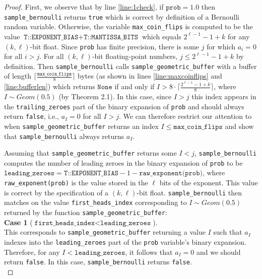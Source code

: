 \documentclass{article}
\begin{document}
\begin{proof}
First, we observe that by line \ref{line:1check}, if $\texttt{prob} = 1.0$ then \texttt{sample\_bernoulli} returns \texttt{true} which is correct by definition of a Bernoulli random variable. Otherwise, the variable \texttt{max\_coin\_flips} is computed to be the value $\texttt{T::EXPONENT\_BIAS} + \texttt{T::MANTISSA\_BITS}$ which equals $2^{\ell - 1} - 1 + k$ for any $(k,\ell)$-bit float. Since \texttt{prob} has finite precision, there is some $j$ for which $a_i = 0$ for all $i > j$. For all $(k,\ell)$-bit floating-point numbers, $j \le 2^{\ell - 1} - 1 + k$ by definition. Then \texttt{sample\_bernoulli} calls \texttt{sample\_geometric\_buffer} with a buffer of length $\lceil \frac{\texttt{max\_coin\_flips}}{8}\rceil$ bytes (as shown in lines \ref{line:maxcoinflips} and \ref{line:bufferlen}) which returns  $\texttt{None}$ if and only if $I > {8\cdot \lceil \frac{2^{\ell - 1} -1 + k}{8}\rceil}$, where $I \sim Geom(0.5)$ (by Theorem 2.1). In this case, since $I > j$ this index appears in the \texttt{trailing\_zeroes} part of the binary expansion of \texttt{prob} and should always return \texttt{false}, i.e., $a_I = 0$ for all $I > j$. We can therefore restrict our attention to when \texttt{sample\_geometric\_buffer} returns an index $I \le \texttt{max\_coin\_flips}$ and show that \texttt{sample\_bernoulli} always returns $a_I$.

Assuming that \texttt{sample\_geometric\_buffer} returns some $I < j$,  \texttt{sample\_bernoulli} computes the number of leading zeroes in the binary expansion of \texttt{prob} to be $\texttt{leading\_zeroes} = \texttt{T::EXPONENT\_BIAS} - 1 - \texttt{raw\_exponent(prob)}$, where \texttt{raw\_exponent(prob)} is the value stored in the $\ell$ bits of the exponent. This value is correct by the specification of a $(k,\ell)$-bit float.  \texttt{sample\_bernoulli} then matches on the value \texttt{first\_heads\_index} corresponding to $I \sim Geom(0.5)$ returned by the function \texttt{sample\_geometric\_buffer}: \\

\noindent\textbf{Case 1} ($\texttt{first\_heads\_index} < \texttt{leading\_zeroes}$). \\
\noindent This corresponds to \texttt{sample\_geometric\_buffer} returning a value $I$ such that $a_I$ indexes into the \texttt{leading\_zeroes} part of the  \texttt{prob} variable's binary expansion. Therefore, for any $I < \texttt{leading\_zeroes}$, it follows that $a_I = 0$ and we should return \texttt{false}. In this case, \texttt{sample\_bernoulli} returns \texttt{false}.\\


\end{proof}
\end{document}
